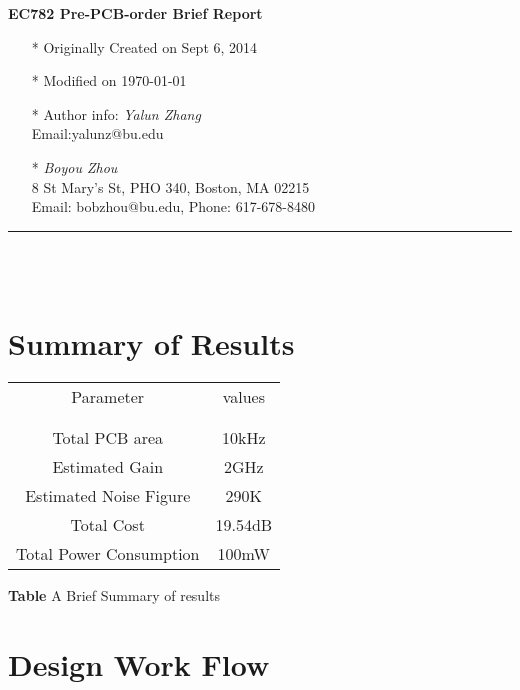 \documentclass[]{article}
\begin{document}
\pagestyle{empty}
{\large\textbf{EC782 Pre-PCB-order Brief Report}}

\begin{multicols}{2}

    \begin{itemize}
        \item[*] Originally Created on Sept 6, 2014
        \item[*] Modified on \today
        \item[*] Author info: \textit{Yalun Zhang}\\ 
                 Email:yalunz@bu.edu
                    
    \end{itemize}

    \columnbreak

    \begin{itemize}
        \item[ ]
        \item[ ]
        \item[*] \textit {Boyou Zhou}\\
                 8 St Mary's St, PHO 340, Boston, MA 02215\\
                 Email: bobzhou@bu.edu, Phone: 617-678-8480
    \end{itemize}

\end{multicols}

\rule[-0.1cm]{7.5in}{0.01cm}\\
\\
\indent		             
\section {Summary of Results}

\begin{center}
    \begin{tabular}{c c}
        Parameter & values \\ \\ \hline \\
        Total PCB area & 10kHz \\
        Estimated Gain & 2GHz \\
        Estimated Noise Figure & 290K \\
        Total Cost & 19.54dB \\
        Total Power Consumption & 100mW
    \end{tabular}
\end{center}

\begin{center}
    \textbf{Table} A Brief Summary of results
\end{center}

\section{Design Work Flow}
\end{document}
